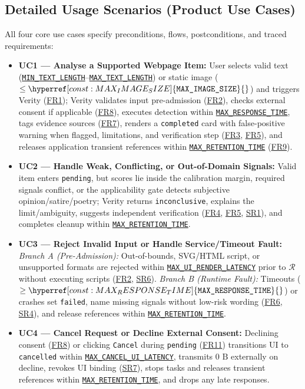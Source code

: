 \documentclass[11pt]{article}
\newcommand{\MaxResponseTime}{\hyperref[const:MAX_RESPONSE_TIME]{\texttt{MAX\_\allowbreak{}RESPONSE\_\allowbreak{}TIME}}}
\newcommand{\MinTextLength}{\hyperref[const:MIN_TEXT_LENGTH]{\texttt{MIN\_\allowbreak{}TEXT\_\allowbreak{}LENGTH}}}
\newcommand{\MaxTextLength}{\hyperref[const:MAX_TEXT_LENGTH]{\texttt{MAX\_\allowbreak{}TEXT\_\allowbreak{}LENGTH}}}
\newcommand{\MaxImageSize}{\hyperref[const:MAX_IMAGE_SIZE]{\texttt{MAX\_\allowbreak{}IMAGE\_\allowbreak{}SIZE}}}
\newcommand{\MaxRetentionTime}{\hyperref[const:MAX_RETENTION_TIME]{\texttt{MAX\_\allowbreak{}RETENTION\_\allowbreak{}TIME}}}
\newcommand{\MaxUiRenderLatency}{\hyperref[const:MAX_UI_RENDER_LATENCY]{\texttt{MAX\_\allowbreak{}UI\_\allowbreak{}RENDER\_\allowbreak{}LATENCY}}}
\newcommand{\MaxCancelUiLatency}{\hyperref[const:MAX_CANCEL_UI_LATENCY]{\texttt{MAX\_\allowbreak{}CANCEL\_\allowbreak{}UI\_\allowbreak{}LATENCY}}}
\begin{document}
\subsection{Detailed Usage Scenarios (Product Use Cases)}\label{subsec:detailed-use-cases}

All four core use cases specify preconditions, flows, postconditions, and traced requirements:
\begin{itemize}[leftmargin=*, itemsep=4pt]
    \item {}\label{UC1}\textbf{UC1 --- Analyse a Supported Webpage Item:} User selects valid text (\MinTextLength{}--\MaxTextLength{}) or static image ($\le \MaxImageSize{}$) and triggers Verity (\hyperref[FR1]{FR1}); Verity validates input pre-admission (\hyperref[FR2]{FR2}), checks external consent if applicable (\hyperref[FR8]{FR8}), executes detection within \MaxResponseTime{}, tags evidence sources (\hyperref[FR7]{FR7}), renders a \texttt{completed} card with false-positive warning when flagged, limitations, and verification step (\hyperref[FR3]{FR3}, \hyperref[FR5]{FR5}), and releases application transient references within \MaxRetentionTime{} (\hyperref[FR9]{FR9}).
    \item {}\label{UC2}\textbf{UC2 --- Handle Weak, Conflicting, or Out-of-Domain Signals:} Valid item enters \texttt{pending}, but scores lie inside the calibration margin, required signals conflict, or the applicability gate detects subjective opinion/satire/poetry; Verity returns \texttt{inconclusive}, explains the limit/ambiguity, suggests independent verification (\hyperref[FR4]{FR4}, \hyperref[FR5]{FR5}, \hyperref[SR1]{SR1}), and completes cleanup within \MaxRetentionTime{}.
    \item {}\label{UC3}\textbf{UC3 --- Reject Invalid Input or Handle Service/Timeout Fault:} \emph{Branch A (Pre-Admission):} Out-of-bounds, SVG/HTML script, or unsupported formats are rejected within \MaxUiRenderLatency{} prior to $\mathcal{R}$ without executing scripts (\hyperref[FR2]{FR2}, \hyperref[SR6]{SR6}). \emph{Branch B (Runtime Fault):} Timeouts ($\ge \MaxResponseTime{}$) or crashes set \texttt{failed}, name missing signals without low-risk wording (\hyperref[FR6]{FR6}, \hyperref[SR4]{SR4}), and release references within \MaxRetentionTime{}.
    \item {}\label{UC4}\textbf{UC4 --- Cancel Request or Decline External Consent:} Declining consent (\hyperref[FR8]{FR8}) or clicking \texttt{Cancel} during \texttt{pending} (\hyperref[FR11]{FR11}) transitions UI to \texttt{cancelled} within \MaxCancelUiLatency{}, transmits $0\text{ B}$ externally on decline, revokes UI binding (\hyperref[SR7]{SR7}), stops tasks and releases transient references within \MaxRetentionTime{}, and drops any late responses.
\end{itemize}
\end{document}
